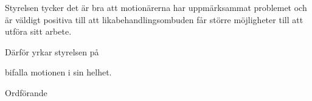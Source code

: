 \documentclass[../_main/handlingar.tex]{subfiles}
\begin{document}
\motionssvar

Styrelsen tycker det är bra att motionärerna har uppmärksammat problemet och är väldigt positiva till att likabehandlingsombuden får större möjligheter till att utföra sitt arbete.

Därför yrkar styrelsen på
\begin{attsatser}
    \att bifalla motionen i sin helhet.
\end{attsatser}

\begin{signatures}{1}
    \ist
    \signature{Erik Månsson}{Ordförande}
\end{signatures}
\end{document}
